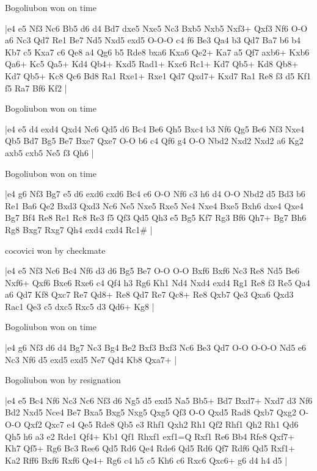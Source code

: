 \showboard

Bogoliubon won on time

\makegametitle
|e4 e5 Nf3 Nc6 Bb5 d6 d4 Bd7 dxe5 Nxe5 Nc3 Bxb5 Nxb5 Nxf3+ Qxf3 Nf6 O-O a6 Nc3 Qd7 Re1 Be7 Nd5 Nxd5 exd5 O-O-O c4 f6 Be3 Qa4 b3 Qd7 Ba7 b6 b4 Kb7 c5 Kxa7 c6 Qe8 a4 Qg6 b5 Rde8 bxa6 Kxa6 Qe2+ Ka7 a5 Qf7 axb6+ Kxb6 Qa6+ Kc5 Qa5+ Kd4 Qb4+ Kxd5 Rad1+ Kxc6 Rc1+ Kd7 Qb5+ Kd8 Qb8+ Kd7 Qb5+ Kc8 Qc6 Bd8 Ra1 Rxe1+ Rxe1 Qd7 Qxd7+ Kxd7 Ra1 Re8 f3 d5 Kf1 f5 Ra7 Bf6 Kf2  |

\showboard

Bogoliubon won on time

\makegametitle
|e4 e5 d4 exd4 Qxd4 Nc6 Qd5 d6 Bc4 Be6 Qh5 Bxc4 b3 Nf6 Qg5 Be6 Nf3 Nxe4 Qb5 Bd7 Bg5 Be7 Bxe7 Qxe7 O-O b6 c4 Qf6 g4 O-O Nbd2 Nxd2 Nxd2 a6 Kg2 axb5 cxb5 Ne5 f3 Qh6  |

\showboard

Bogoliubon won on time

\makegametitle
|e4 g6 Nf3 Bg7 e5 d6 exd6 cxd6 Bc4 e6 O-O Nf6 c3 h6 d4 O-O Nbd2 d5 Bd3 b6 Re1 Ba6 Qe2 Bxd3 Qxd3 Nc6 Ne5 Nxe5 Rxe5 Ne4 Nxe4 Bxe5 Bxh6 dxe4 Qxe4 Bg7 Bf4 Re8 Re1 Rc8 Re3 f5 Qf3 Qd5 Qh3 e5 Bg5 Kf7 Rg3 Bf6 Qh7+ Bg7 Bh6 Rg8 Bxg7 Rxg7 Qh4 exd4 cxd4 Rc1\#  |

\showboard

cocovici won by checkmate

\makegametitle
|e4 e5 Nf3 Nc6 Bc4 Nf6 d3 d6 Bg5 Be7 O-O O-O Bxf6 Bxf6 Nc3 Re8 Nd5 Be6 Nxf6+ Qxf6 Bxe6 Rxe6 c4 Qf4 h3 Rg6 Kh1 Nd4 Nxd4 exd4 Rg1 Re8 f3 Re5 Qa4 a6 Qd7 Kf8 Qxc7 Re7 Qd8+ Re8 Qd7 Re7 Qc8+ Re8 Qxb7 Qe3 Qxa6 Qxd3 Rac1 Qe3 c5 dxc5 Rxc5 d3 Qd6+ Kg8  |

\showboard

Bogoliubon won on time

\makegametitle
|e4 g6 Nf3 d6 d4 Bg7 Nc3 Bg4 Be2 Bxf3 Bxf3 Nc6 Be3 Qd7 O-O O-O-O Nd5 e6 Nc3 Nf6 d5 exd5 exd5 Ne7 Qd4 Kb8 Qxa7+  |

\showboard

Bogoliubon won by resignation

\makegametitle
|e4 e5 Bc4 Nf6 Nc3 Nc6 Nf3 d6 Ng5 d5 exd5 Na5 Bb5+ Bd7 Bxd7+ Nxd7 d3 Nf6 Bd2 Nxd5 Nce4 Be7 Bxa5 Bxg5 Nxg5 Qxg5 Qf3 O-O Qxd5 Rad8 Qxb7 Qxg2 O-O-O Qxf2 Qxc7 e4 Qe5 Rde8 Qb5 e3 Rhf1 Qxh2 Rh1 Qf2 Rhf1 Qh2 Rh1 Qd6 Qh5 h6 a3 e2 Rde1 Qf4+ Kb1 Qf1 Rhxf1 exf1=Q Rxf1 Re6 Bb4 Rfe8 Qxf7+ Kh7 Qf5+ Rg6 Bc3 Ree6 Qd5 Rd6 Qe4 Rde6 Qd5 Rd6 Qf7 Rdf6 Qd5 Rxf1+ Ka2 Rff6 Bxf6 Rxf6 Qe4+ Rg6 c4 h5 c5 Kh6 c6 Rxc6 Qxc6+ g6 d4 h4 d5  |

